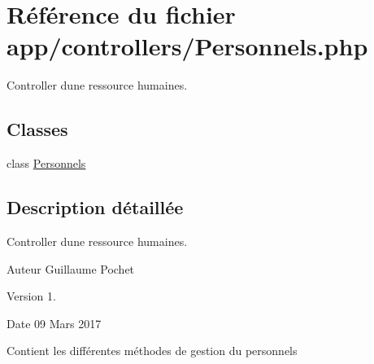 \hypertarget{_personnels_8php}{}\section{Référence du fichier app/controllers/\+Personnels.php}
\label{_personnels_8php}


Controller d\textquotesingle{}une ressource humaines.  


\subsection*{Classes}
\begin{DoxyCompactItemize}
\item 
class \hyperlink{class_personnels}{Personnels}
\end{DoxyCompactItemize}


\subsection{Description détaillée}
Controller d\textquotesingle{}une ressource humaines. 

\begin{DoxyAuthor}{Auteur}
Guillaume Pochet 
\end{DoxyAuthor}
\begin{DoxyVersion}{Version}
1. 
\end{DoxyVersion}
\begin{DoxyDate}{Date}
09 Mars 2017
\end{DoxyDate}
Contient les différentes méthodes de gestion du personnels 
